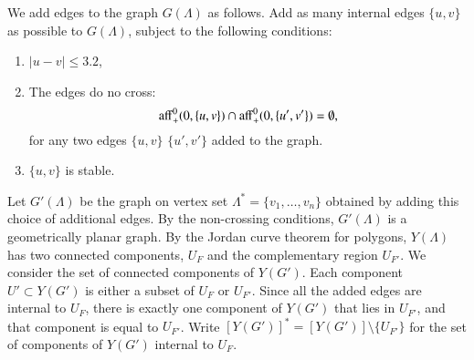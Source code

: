 We add edges to the graph $G(\Lambda)$ 
as follows.  
Add as many internal edges $\{u,v\}$ as possible to $G(\Lambda)$, subject
to the following conditions:
\begin{enumerate}
\item  $|u-v|\le3.2$, 
\item The edges do no cross:
  $$%
  \op{aff}_+^0(0,\{u,v\}) \cap \op{aff}_+^0(0,\{u',v'\}) = \emptyset,
  $$%
for any two edges $\{u,v\}$ $\{u',v'\}$ added to the graph.
\item  $\{u,v\}$ is stable.
\end{enumerate}  

Let $G'(\Lambda)$ be the graph on vertex set $\Lambda^*=\{v_1,\ldots,v_n\}$ obtained by adding this choice of additional edges.  By the non-crossing
conditions, $G'(\Lambda)$ is a geometrically planar graph.  
By the Jordan curve theorem for polygons, $Y(\Lambda)$ has two connected 
components,
$U_F$ and the complementary region $U_{F'}$.
We consider the set of connected components of $Y(G')$.  Each
component $U'\subset Y(G')$ is either a subset of $U_F$ or $U_{F'}$.
Since all the added edges are internal to $U_F$, there is exactly
one component of $Y(G')$ that lies in $U_{F'}$, and that component
is equal to $U_{F'}$.  Write $[Y(G')]^* = [Y(G')]\setminus\{U_{F'}\}$
for the set of components of $Y(G')$ internal to $U_F$.

